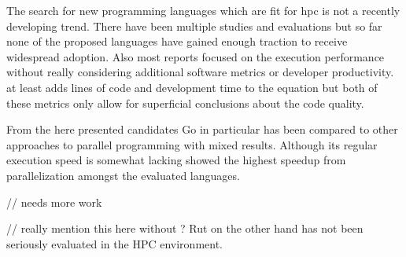The search for new programming languages which are fit for \gls{hpc} is not a recently developing trend. There have been multiple studies and evaluations but so far none of the proposed languages have gained enough traction to receive widespread adoption. Also most reports focused on the execution performance without really considering additional software metrics or developer productivity. \cite{related_multicore} at least adds lines of code and development time to the equation but both of these metrics only allow for superficial conclusions about the code quality.

From the here presented candidates Go in particular has been compared to other approaches to parallel programming with mixed results. Although its regular execution speed is somewhat lacking \cite{related_sor_study} showed the highest speedup from parallelization amongst the evaluated languages.

// needs more work

// really mention this here without ?
Rut on the other hand has not been seriously evaluated in the HPC environment.

